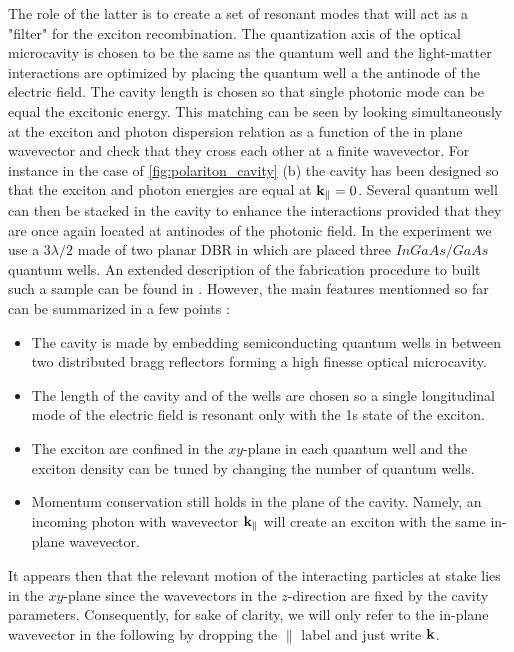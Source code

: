 The role of the latter is to create a set of resonant modes that will act as a "filter" for the exciton recombination. 
The quantization axis of the optical microcavity is chosen to be the same as the quantum well and the light-matter
interactions are optimized by placing the quantum well a the antinode of the electric field. The cavity length is chosen so that single photonic mode can be equal the excitonic energy.
This matching can be seen by looking simultaneously at the exciton and photon dispersion relation as a function of the in plane wavevector and check that they cross each other at a finite wavevector. For instance in the case of \autoref{fig:polariton_cavity} (b) the cavity has been designed so that the exciton and photon energies are equal at $\mathbf{k}_\parallel=0$.
Several quantum well can then be stacked in the cavity to enhance the interactions provided that they are once again located at antinodes of the photonic field.
In the experiment we use a $3\lambda/2$ made of two planar DBR in which are placed three $InGaAs/GaAs$ quantum wells. An extended description of the fabrication procedure to built such a sample can be
found in \cite{maitre_thesis}. However, the main features mentionned so far can be summarized in a few points :

\begin{itemize}
    \item The cavity is made by embedding semiconducting quantum wells in between two distributed bragg reflectors forming a high finesse optical microcavity.
    \item The length of the cavity and of the wells are chosen so a single longitudinal mode of the electric field is resonant only with the 1s state of the exciton.
    \item The exciton are confined in the $xy$-plane in each quantum well and the exciton density can be tuned by changing the number of quantum wells.
    \item Momentum conservation still holds in the plane of the cavity. Namely, an incoming photon with wavevector $\mathbf{k}_\parallel$ will create an exciton with the same in-plane wavevector. 
\end{itemize}
It appears then that the relevant motion of the interacting particles at stake lies in the $xy$-plane since the wavevectors in 
the  $z$-direction are fixed by the cavity parameters. Consequently, for sake of clarity, we will only refer to the in-plane wavevector in the following
by dropping the $\parallel$ label and just write $\mathbf{k}$.

